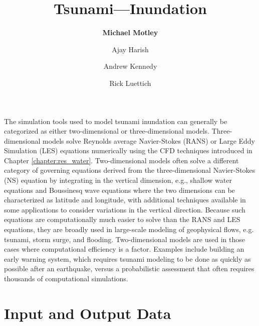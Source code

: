 %
%
%


\title{Tsunami---Inundation}
\author{
    \textbf{Michael Motley} 
    \and Ajay Harish
    \and Andrew Kennedy
    \and Rick Luettich}
\tocauthor{}
%
%
\maketitle
\label{chapter:haz_tsunami}

The simulation tools used to model tsunami inundation can generally be categorized as either two-dimensional or three-dimensional models. Three-dimensional models solve Reynolds average Navier-Stokes (RANS) or Large Eddy Simulation (LES) equations numerically using the CFD techniques introduced in Chapter \ref{chapter:res_water}. Two-dimensional models often solve a different category of governing equations derived from the three-dimensional Navier-Stokes (NS) equation by integrating in the vertical dimension, e.g., shallow water equations and Boussinesq wave equations where the two dimensions can be characterized as latitude and longitude, with additional techniques available in some applications to consider variations in the vertical direction. Because such equations are computationally much easier to solve than the RANS and LES equations, they are broadly used in large-scale modeling of geophysical flows, e.g. tsunami, storm surge, and flooding. Two-dimensional models are used in those cases where computational efficiency is a factor. Examples include building an early warning system, which requires tsunami modeling to be done as quickly as possible after an earthquake, versus a probabilistic assessment that often requires thousands of computational simulations.

\section{Input and Output Data}
\label{sec:tsunami_io}

